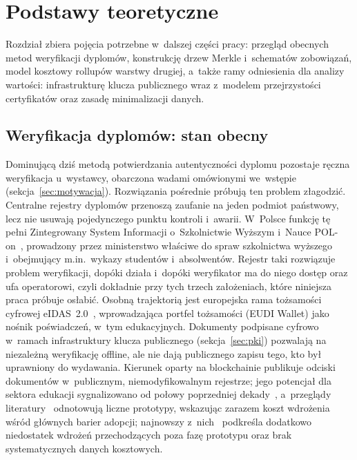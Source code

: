 \chapter{Podstawy teoretyczne}
\label{ch:podstawy}

Rozdział zbiera pojęcia potrzebne w~dalszej części pracy: przegląd obecnych metod
weryfikacji dyplomów, konstrukcję drzew Merkle i~schematów zobowiązań, model
kosztowy rollupów warstwy drugiej, a~także ramy odniesienia dla analizy wartości:
infrastrukturę klucza publicznego wraz z~modelem przejrzystości certyfikatów oraz
zasadę minimalizacji danych.

\section{Weryfikacja dyplomów: stan obecny}
\label{sec:stan-obecny}

Dominującą dziś metodą potwierdzania autentyczności dyplomu pozostaje ręczna
weryfikacja u~wystawcy, obarczona wadami omówionymi we~wstępie
(sekcja~\ref{sec:motywacja}). Rozwiązania pośrednie próbują ten problem złagodzić.
Centralne rejestry dyplomów przenoszą zaufanie na jeden podmiot państwowy, lecz nie
usuwają pojedynczego punktu kontroli i~awarii. W~Polsce funkcję tę pełni
Zintegrowany System Informacji o~Szkolnictwie Wyższym i~Nauce POL-on~\cite{polon},
prowadzony przez ministerstwo właściwe do spraw szkolnictwa wyższego i~obejmujący
m.in.\ wykazy studentów i~absolwentów. Rejestr taki rozwiązuje problem
weryfikacji, dopóki działa i~dopóki weryfikator ma do niego dostęp oraz ufa
operatorowi, czyli dokładnie przy tych trzech założeniach, które niniejsza praca
próbuje osłabić. Osobną trajektorią jest europejska rama tożsamości cyfrowej
eIDAS~2.0~\cite{eidas2}, wprowadzająca portfel tożsamości (EUDI Wallet) jako
nośnik poświadczeń, w~tym edukacyjnych. Dokumenty podpisane cyfrowo
w~ramach infrastruktury klucza publicznego (sekcja~\ref{sec:pki}) pozwalają na
niezależną weryfikację offline, ale nie dają publicznego zapisu tego, kto był
uprawniony do wydawania. Kierunek oparty na blockchainie
publikuje odciski dokumentów w~publicznym, niemodyfikowalnym rejestrze; jego
potencjał dla sektora edukacji sygnalizowano od połowy poprzedniej
dekady~\cite{sharples2016,chen2018}, a~przeglądy
literatury~\cite{grech2017,alammary2019,rustemi2023} odnotowują liczne prototypy,
wskazując zarazem koszt wdrożenia wśród głównych barier adopcji; najnowszy
z~nich~\cite{rustemi2023} podkreśla dodatkowo niedostatek wdrożeń
przechodzących poza fazę prototypu oraz brak systematycznych danych kosztowych.

